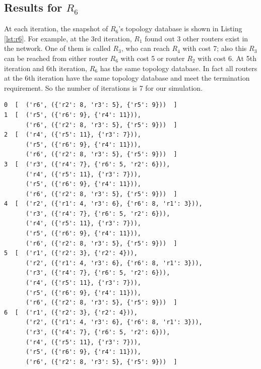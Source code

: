 \documentclass[12pt]{article}  %
\theoremstyle{definition}
\theoremstyle{remark}
\begin{document}
\subsection{Results for $R_6$}
At each iteration, the snapshot of $R_6$'s topology database is shown in Listing \ref{lst:r6}.
For example, at the 3rd iteration, $R_1$ found out 3 other routers exist in the network.
One of them is called $R_3$, who can reach $R_4$ with cost 7;
also this $R_3$ can be reached from either router $R_6$ with cost 5 or router $R_2$ with cost 6.
At 5th iteration and 6th iteration, $R_6$ has the same topology database.
In fact all routers at the 6th iteration have the same topology database and meet the termination requirement.
So the number of iterations is 7 for our simulation.

\begin{lstlisting}
0  [  ('r6', ({'r2': 8, 'r3': 5}, {'r5': 9}))  ]
1  [  ('r5', ({'r6': 9}, {'r4': 11})),
      ('r6', ({'r2': 8, 'r3': 5}, {'r5': 9}))  ]
2  [  ('r4', ({'r5': 11}, {'r3': 7})),
      ('r5', ({'r6': 9}, {'r4': 11})),
      ('r6', ({'r2': 8, 'r3': 5}, {'r5': 9}))  ]
3  [  ('r3', ({'r4': 7}, {'r6': 5, 'r2': 6})),
      ('r4', ({'r5': 11}, {'r3': 7})),
      ('r5', ({'r6': 9}, {'r4': 11})),
      ('r6', ({'r2': 8, 'r3': 5}, {'r5': 9}))  ]
4  [  ('r2', ({'r1': 4, 'r3': 6}, {'r6': 8, 'r1': 3})),
      ('r3', ({'r4': 7}, {'r6': 5, 'r2': 6})),
      ('r4', ({'r5': 11}, {'r3': 7})),
      ('r5', ({'r6': 9}, {'r4': 11})),
      ('r6', ({'r2': 8, 'r3': 5}, {'r5': 9}))  ]
5  [  ('r1', ({'r2': 3}, {'r2': 4})),
      ('r2', ({'r1': 4, 'r3': 6}, {'r6': 8, 'r1': 3})),
      ('r3', ({'r4': 7}, {'r6': 5, 'r2': 6})),
      ('r4', ({'r5': 11}, {'r3': 7})),
      ('r5', ({'r6': 9}, {'r4': 11})),
      ('r6', ({'r2': 8, 'r3': 5}, {'r5': 9}))  ]
6  [  ('r1', ({'r2': 3}, {'r2': 4})),
      ('r2', ({'r1': 4, 'r3': 6}, {'r6': 8, 'r1': 3})),
      ('r3', ({'r4': 7}, {'r6': 5, 'r2': 6})),
      ('r4', ({'r5': 11}, {'r3': 7})),
      ('r5', ({'r6': 9}, {'r4': 11})),
      ('r6', ({'r2': 8, 'r3': 5}, {'r5': 9}))  ]
\end{lstlisting}
\end{document}
